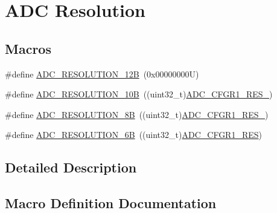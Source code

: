 \hypertarget{group___a_d_c___resolution}{}\section{A\+DC Resolution}
\label{group___a_d_c___resolution}
\subsection*{Macros}
\begin{DoxyCompactItemize}
\item 
\#define \hyperlink{group___a_d_c___resolution_ga49c8408a1cdbf97bbf29234c3770fa74}{A\+D\+C\+\_\+\+R\+E\+S\+O\+L\+U\+T\+I\+O\+N\+\_\+12B}~(0x00000000\+U)
\item 
\#define \hyperlink{group___a_d_c___resolution_ga91289e269eb3080d25301909c0f417e5}{A\+D\+C\+\_\+\+R\+E\+S\+O\+L\+U\+T\+I\+O\+N\+\_\+10B}~((uint32\+\_\+t)\hyperlink{group___peripheral___registers___bits___definition_gaa09ba21ff2817d7633982748c7afe8ff}{A\+D\+C\+\_\+\+C\+F\+G\+R1\+\_\+\+R\+E\+S\+\_})
\item 
\#define \hyperlink{group___a_d_c___resolution_ga39925af93719877bdcc5664e4b95e69a}{A\+D\+C\+\_\+\+R\+E\+S\+O\+L\+U\+T\+I\+O\+N\+\_\+8B}~((uint32\+\_\+t)\hyperlink{group___peripheral___registers___bits___definition_ga3540c4cec0b318ccc71dfa1317b4f659}{A\+D\+C\+\_\+\+C\+F\+G\+R1\+\_\+\+R\+E\+S\+\_})
\item 
\#define \hyperlink{group___a_d_c___resolution_ga24c5226e05db78b4065f2f187d497b04}{A\+D\+C\+\_\+\+R\+E\+S\+O\+L\+U\+T\+I\+O\+N\+\_\+6B}~((uint32\+\_\+t)\hyperlink{group___peripheral___registers___bits___definition_ga9d5676c559f66561a86e6236ba803f98}{A\+D\+C\+\_\+\+C\+F\+G\+R1\+\_\+\+R\+ES})
\end{DoxyCompactItemize}


\subsection{Detailed Description}


\subsection{Macro Definition Documentation}
\mbox{\label{group___a_d_c___resolution_ga91289e269eb3080d25301909c0f417e5}} 
